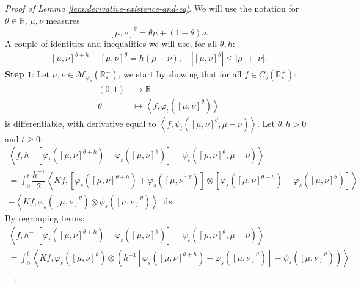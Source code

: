 \documentclass[11pt,a4paper]{article}
\newcommand{\RR}{\mathbb{R}}
\newcommand{\RRP}{\mathbb{R}^+_*}
\newcommand{\MC}{\mathcal{M}}
\newcommand{\brac}[1]{\left\langle#1\right\rangle}
\newcommand{\dd}{\mathop{}\!\mathrm{d}}
\begin{document}
\begin{proof}[Proof of Lemma \ref{lem:derivative-existence-and-eq}]
    We will use the notation for $\theta \in \RR$, $\mu,\nu $ measures 
    \[
    \left[\mu,\nu \right]^\theta = \theta\mu + (1-\theta)\nu.
    \]
    A couple of identities and inequalities we will use, for all $\theta, h$:
    \begin{align*}
        \left[\mu,\nu \right]^{\theta+h} - \left[\mu,\nu \right]^{\theta} = h(\mu - \nu),\quad \left|\left[\mu,\nu \right]^{\theta}\right| \leq |\mu| + |\nu|.
    \end{align*}
    \textbf{Step $1$}: Let $\mu,\nu \in \MC_{\psi_{p}}(\RRP)$, we start by showing that for all $f \in C_b(\RRP)$:
    \begin{align*}
        (0,1) &\to \RR \\
        \theta &\mapsto \brac{f,\varphi_t\left(\left[\mu,\nu \right]^\theta\right)}
    \end{align*}
    is differentiable, with derivative equal to $\brac{f,\psi_t\left(\left[\mu,\nu \right]^\theta,\mu-\nu\right)}$. Let $\theta,h > 0$ and $t \geq 0$:
    \begin{multline*}
        \brac{f,h^{-1}\left[\varphi_t\left(\left[\mu,\nu \right]^{\theta+h} \right) - \varphi_t\left(\left[\mu,\nu \right]^{\theta} \right) \right] - \psi_t\left(\left[\mu,\nu \right]^\theta,\mu-\nu\right)} \\
        = \int_0^t \dfrac{h^{-1}}{2}\brac{Kf,\left[\varphi_s\left(\left[\mu,\nu \right]^{\theta+h} \right) + \varphi_s\left(\left[\mu,\nu \right]^{\theta} \right)\right]\otimes \left[\varphi_s\left(\left[\mu,\nu \right]^{\theta+h} \right) - \varphi_s\left(\left[\mu,\nu \right]^{\theta} \right)\right]} \\
        - \brac{Kf,\varphi_s\left(\left[\mu,\nu \right]^{\theta}\right)\otimes \psi_s\left(\left[\mu,\nu \right]^{\theta}\right) }\dd s.
    \end{multline*}
    By regrouping terms:
    \begin{multline*}
        \brac{f,h^{-1}\left[\varphi_t\left(\left[\mu,\nu \right]^{\theta+h} \right) - \varphi_t\left(\left[\mu,\nu \right]^{\theta} \right) \right] - \psi_t\left(\left[\mu,\nu \right]^\theta,\mu-\nu\right)} \\
        = \int_0^t \brac{Kf,\varphi_s\left(\left[\mu,\nu \right]^{\theta} \right)\otimes \left(h^{-1}\left[\varphi_s\left(\left[\mu,\nu \right]^{\theta+h} \right) - \varphi_s\left(\left[\mu,\nu \right]^{\theta} \right)\right] - \psi_s\left(\left[\mu,\nu \right]^{\theta}\right)\right)} \\

\end{multline*}
\end{proof}
\end{document}
